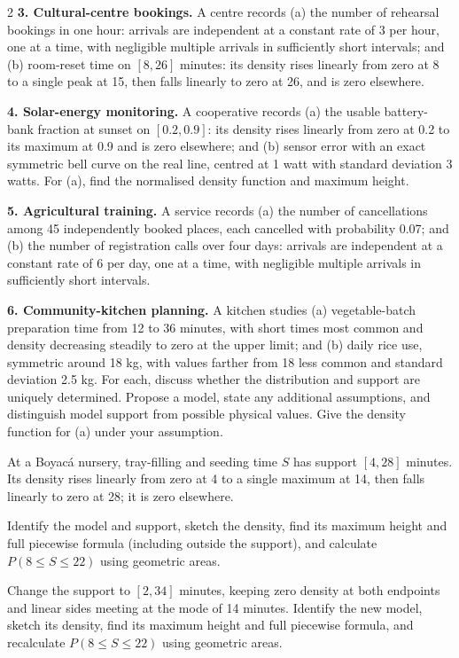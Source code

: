 \begin{multicols}{2}
\textbf{3. Cultural-centre bookings.} A centre records (a) the number of rehearsal bookings in one hour: arrivals are independent at a constant rate of 3 per hour, one at a time, with negligible multiple arrivals in sufficiently short intervals; and (b) room-reset time on $[8,26]$ minutes: its density rises linearly from zero at 8 to a single peak at 15, then falls linearly to zero at 26, and is zero elsewhere. 

\textbf{4. Solar-energy monitoring.} A cooperative records (a) the usable battery-bank fraction at sunset on $[0.2,0.9]$: its density rises linearly from zero at 0.2 to its maximum at 0.9 and is zero elsewhere; and (b) sensor error with an exact symmetric bell curve on the real line, centred at 1 watt with standard deviation 3 watts. For (a), find the normalised density function and maximum height. 

\textbf{5. Agricultural training.} A service records (a) the number of cancellations among 45 independently booked places, each cancelled with probability 0.07; and (b) the number of registration calls over four days: arrivals are independent at a constant rate of 6 per day, one at a time, with negligible multiple arrivals in sufficiently short intervals. 

\textbf{6. Community-kitchen planning.} A kitchen studies (a) vegetable-batch preparation time from 12 to 36 minutes, with short times most common and density decreasing steadily to zero at the upper limit; and (b) daily rice use, symmetric around 18 kg, with values farther from 18 less common and standard deviation 2.5 kg. For each, discuss whether the distribution and support are uniquely determined. Propose a model, state any additional assumptions, and distinguish model support from possible physical values. Give the density function for (a) under your assumption. 


At a Boyac\'a nursery, tray-filling and seeding time $S$ has support $[4,28]$ minutes. Its density rises linearly from zero at 4 to a single maximum at 14, then falls linearly to zero at 28; it is zero elsewhere.

Identify the model and support, sketch the density, find its maximum height and full piecewise formula (including outside the support), and calculate $P(8\le S\le22)$ using geometric areas. 

Change the support to $[2,34]$ minutes, keeping zero density at both endpoints and linear sides meeting at the mode of 14 minutes. Identify the new model, sketch its density, find its maximum height and full piecewise formula, and recalculate $P(8\le S\le22)$ using geometric areas. 




\end{multicols}
